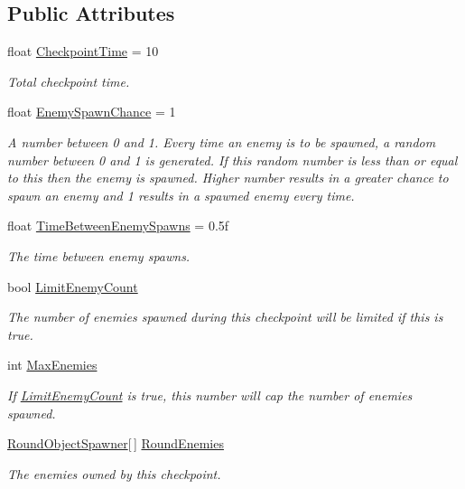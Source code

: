 \subsection*{Public Attributes}
\begin{DoxyCompactItemize}
\item 
float \hyperlink{class_round_manager_1_1_round_checkpoint_ada4e5eb5397f8a0de95c80d0a5c6c74b}{Checkpoint\+Time} = 10
\begin{DoxyCompactList}\small\item\em Total checkpoint time. \end{DoxyCompactList}\item 
float \hyperlink{class_round_manager_1_1_round_checkpoint_aba7ecc26b04bdae77b97cf832a0c124a}{Enemy\+Spawn\+Chance} = 1
\begin{DoxyCompactList}\small\item\em A number between 0 and 1. Every time an enemy is to be spawned, a random number between 0 and 1 is generated. If this random number is less than or equal to this then the enemy is spawned. Higher number results in a greater chance to spawn an enemy and 1 results in a spawned enemy every time. \end{DoxyCompactList}\item 
float \hyperlink{class_round_manager_1_1_round_checkpoint_a89a907432354ddb6380327606010b498}{Time\+Between\+Enemy\+Spawns} = 0.\+5f
\begin{DoxyCompactList}\small\item\em The time between enemy spawns. \end{DoxyCompactList}\item 
bool \hyperlink{class_round_manager_1_1_round_checkpoint_a74d49222fa14c7c369334853014f337b}{Limit\+Enemy\+Count}
\begin{DoxyCompactList}\small\item\em The number of enemies spawned during this checkpoint will be limited if this is true. \end{DoxyCompactList}\item 
int \hyperlink{class_round_manager_1_1_round_checkpoint_a3a6d5508cf0353445c8114d22e00a69b}{Max\+Enemies}
\begin{DoxyCompactList}\small\item\em If \hyperlink{class_round_manager_1_1_round_checkpoint_a74d49222fa14c7c369334853014f337b}{Limit\+Enemy\+Count} is true, this number will cap the number of enemies spawned. \end{DoxyCompactList}\item 
\hyperlink{class_round_object_spawner}{Round\+Object\+Spawner}\mbox{[}$\,$\mbox{]} \hyperlink{class_round_manager_1_1_round_checkpoint_a9e735b282759700b04092b495e9f902b}{Round\+Enemies}
\begin{DoxyCompactList}\small\item\em The enemies owned by this checkpoint. \end{DoxyCompactList}\end{DoxyCompactItemize}
